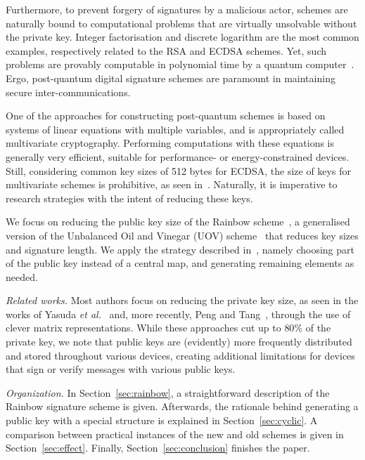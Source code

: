 \documentclass[a4paper, 14pt]{extarticle}
\begin{document}
Furthermore, to prevent forgery of signatures by a malicious actor, schemes are naturally bound to computational problems that are virtually unsolvable without the private key. Integer factorisation and discrete logarithm are the most common examples, respectively related to the RSA and ECDSA schemes. Yet, such problems are provably computable in polynomial time by a quantum computer~\cite{Shor:article:1997:oct}. Ergo, post-quantum digital signature schemes are paramount in maintaining secure inter-communications.

One of the approaches for constructing post-quantum schemes is based on systems of linear equations with multiple variables, and is appropriately called multivariate cryptography. Performing computations with these equations is generally very efficient, suitable for performance- or energy-constrained devices. Still, considering common key sizes of 512 bytes for ECDSA, the size of keys for multivariate schemes is prohibitive, as seen in~\cite[Table 6.4]{Petzoldt:phd:2013:jul}. Naturally, it is imperative to research strategies with the intent of reducing these keys.

We focus on reducing the public key size of the Rainbow scheme~\cite{Ding:inproc:2005:jun}, a generalised version of the Unbalanced Oil and Vinegar (UOV) scheme~\cite{Kipnis:inproc:1999:apr} that reduces key sizes and signature length. We apply the strategy described in~\cite[Chapter 7]{Petzoldt:phd:2013:jul}, namely choosing part of the public key instead of a central map, and generating remaining elements as needed.

\emph{Related works.} Most authors focus on reducing the private key size, as seen in the works of Yasuda \emph{et al.}~\cite{Yasuda:inproc:2013:may, Yasuda:inproc:2014:apr, Yasuda:article:2014:sep} and, more recently, Peng and Tang~\cite{Peng:article:2017:jun}, through the use of clever matrix representations. While these approaches cut up to $80\%$ of the private key, we note that public keys are (evidently) more frequently distributed and stored throughout various devices, creating additional limitations for devices that sign or verify messages with various public keys.

\emph{Organization.} In Section~\ref{sec:rainbow}, a straightforward description of the Rainbow signature scheme is given. Afterwards, the rationale behind generating a public key with a special structure is explained in Section~\ref{sec:cyclic}. A comparison between practical instances of the new and old schemes is given in Section~\ref{sec:effect}. Finally, Section~\ref{sec:conclusion} finishes the paper.
\end{document}
